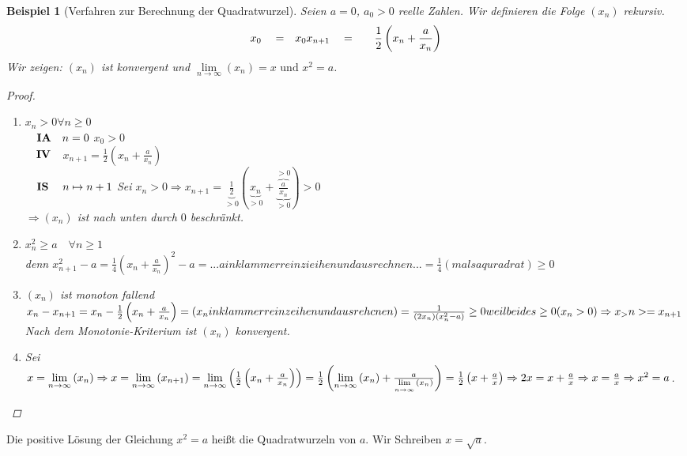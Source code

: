 \documentclass[a4paper,titlepage,oneside]{article}
\newcommand{\alQ}[1]{\ensuremath{\quad#1&\quad}}
\def\sp{\hspace{0,1cm}}
\newcommand{\IA}[1]{\newline\vspace{0.1cm}\ensuremath{\text{\quad\textbf{IA}\quad}#1}\quad}
\newcommand{\IV}{\newline\vspace{0.1cm}\ensuremath{\text{\quad\textbf{IV}\quad}}}
\newcommand{\IS}[1]{\newline\vspace{0.1cm}\ensuremath{\text{\quad\textbf{IS}\quad\sp}#1}}
\renewcommand{\liminf}[2]{\ensuremath{\lim\limits_{#1 \rightarrow \infty}{\left(#2\right)}}}
\theoremstyle{thmstyle}
\newtheorem{bsp}[satz]{Beispiel}
\begin{document}
\begin{bsp}[Verfahren zur Berechnung der Quadratwurzel]
Seien \(a = 0\), \(a_0 > 0\) reelle Zahlen. Wir definieren die Folge \((x_n)\) rekursiv.
\begin{align*}
x_0 \alQ{=} x_0
x_{n+1} \alQ{=} \frac{1}{2}\left(x_n + \frac{a}{x_n}\right)
\end{align*}
Wir zeigen: \((x_n)\) ist konvergent und \(\liminf{n}{x_n} = x \text{ und } x^2 = a\).
\begin{proof}
\begin{enumerate}
\item \(x_n > 0 \forall n \ge 0\) \\
\IA{n=0} \( x_0 > 0 \) \\
\IV \(x_{n+1} =  \frac{1}{2}\left(x_n + \frac{a}{x_n}\right)\) \\
\IS{n \mapsto n+1}
Sei \(x_n > 0 \Rightarrow x_{n+1} = \underbrace{\frac{1}{2}}_{> 0}\left(\underbrace{x_n}_{> 0} + \underbrace{\overbrace{\frac{a}{x_n}}^{> 0}}_{>0}\right) > 0\) \\
\(\Rightarrow (x_n) \) ist nach unten durch \(0\) beschränkt.
\item \(x_n^2 \ge a \quad \forall n \ge 1\) \\
denn \(x_{n+1}^2 - a = \frac{1}{4}\left(x_n + \frac{a}{x_n}\right)^2  - a = ... a in klammer rein zieihen und ausrechnen ... = \frac{1}{4} (mals a quradrat) \ge 0\)
\item \((x_n)\) ist monoton fallend \\
\(x_n - x_{n+1} = x_n - \frac{1}{2} \left(x_n + \frac{a}{x_n}\right) = (x_n in klammer rein zeihen und ausrehcnen ) = \frac{1}{(2x_n)(x_n^2 - a)} \ge 0 \\
 weil beides \ge 0 (x_n > 0) \Rightarrow x_>n >= x_{n+1} \) \\
Nach dem Monotonie-Kriterium ist \((x_n)\) konvergent.
\item Sei \(x= \liminf{n}{x_n} \Rightarrow x = \liminf{n}{x_{n+1}} = \liminf{n}{\frac{1}{2}\left(x_n + \frac{a}{x_n}\right)} = \frac{1}{2}\left(\liminf{n}{x_n} + \frac{a}{\liminf{n}{x_n}}\right) =  \frac{1}{2}\left(x + \frac{a}{x}\right) \Rightarrow 2x = x + \frac{a}{x} \Rightarrow  \\
x = \frac{a}{x} \Rightarrow x^2 = a\).
\end{enumerate}
\end{proof}
\end{bsp}
Die positive Lösung der Gleichung \(x^2 = a\) heißt die Quadratwurzeln von \(a\). Wir Schreiben \(x = \sqrt{a}\).
\end{document}
